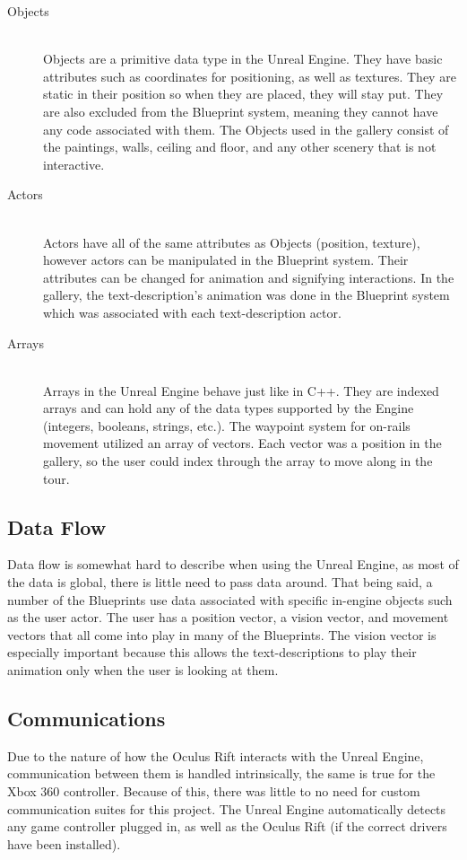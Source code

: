  \begin{description}
 \item[Objects] \hfill \\
 Objects are a primitive data type in the Unreal Engine.  They have basic attributes such as coordinates for positioning, as well as textures.  They are static in their position so when they are placed, they will stay put.  They are also excluded from the Blueprint system, meaning they cannot have any code associated with them.  The Objects used in the gallery consist of the paintings, walls, ceiling and floor, and any other scenery that is not interactive.
 
 \item[Actors] \hfill \\
 Actors have all of the same attributes as Objects (position, texture), however actors can be manipulated in the Blueprint system.  Their attributes can be changed for animation and signifying interactions.  In the gallery, the text-description's animation was done in the Blueprint system which was associated with each text-description actor.
 
 \item[Arrays] \hfill \\
 Arrays in the Unreal Engine behave just like in C++. They are indexed arrays and can hold any of the data types supported by the Engine (integers, booleans, strings, etc.).  The waypoint system for on-rails movement utilized an array of vectors.  Each vector was a position in the gallery, so the user could index through the array to move along in the tour.
 \end{description}
  
 \subsection{Data Flow}
  Data flow is somewhat hard to describe when using the Unreal Engine, as most of the data is global, there is little need to pass data around.  That being said, a number of the Blueprints use data associated with specific in-engine objects such as the user actor.  The user has a position vector, a vision vector, and movement vectors that all come into play in many of the Blueprints.  The vision vector is especially important because this allows the text-descriptions to play their animation only when the user is looking at them.  
 
 \subsection{Communications}
 Due to the nature of how the Oculus Rift interacts with the Unreal Engine, communication between them is handled intrinsically, the same is true for the Xbox 360 controller.  Because of this, there was little to no need for custom communication suites for this project.  The Unreal Engine automatically detects any game controller plugged in, as well as the Oculus Rift (if the correct drivers have been installed).
 
